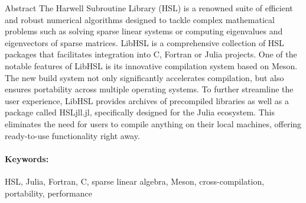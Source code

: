 \documentclass[gdweb]{geradwp}
\renewcommand{\_}{\raisebox{+0.35mm}{\textunderscore}}
\newcommand{\LibHSL}{LibHSL\xspace}
\newcommand{\HSLjll}{HSL\_jll.jl\xspace}
\begin{document}
\GDpageCouverture

\begin{GDpagetitre}

\begin{GDauthlist}
\end{GDauthlist}

\begin{GDaffillist}
\end{GDaffillist}

\begin{GDemaillist}
\end{GDemaillist}

\end{GDpagetitre}


\GDabstracts

\begin{GDabstract}{Abstract}
The Harwell Subroutine Library (HSL) is a renowned suite of efficient and robust numerical algorithms designed to tackle complex mathematical problems such as solving sparse linear systems or computing eigenvalues and eigenvectors of sparse matrices.
\LibHSL is a comprehensive collection of HSL packages that facilitates integration into C, Fortran or Julia projects.
One of the notable features of \LibHSL is its innovative compilation system based on Meson.
The new build system not only significantly accelerates compilation, but also ensures portability across multiple operating systems.
To further streamline the user experience, \LibHSL provides archives of precompiled libraries as well as a package called \HSLjll, specifically designed for the Julia ecosystem.
This eliminates the need for users to compile anything on their local machines, offering ready-to-use functionality right away.

\paragraph{Keywords: }
HSL, Julia, Fortran, C, sparse linear algebra, Meson, cross-compilation, portability, performance
\end{GDabstract}
\end{document}
